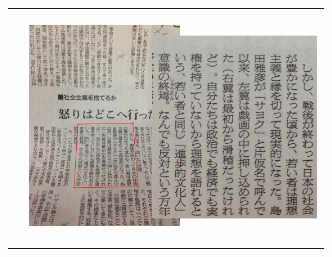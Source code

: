 \documentclass[a4paper,11pt]{article}
\makeatletter
\newlength{\outerbordwidth}
\newcommand{\resheading}[1]{\vspace{-5pt}
    \parbox{\textwidth}{\setlength{\FrameSep}{\outerbordwidth}
    \begin{shaded}
        \setlength{\fboxsep}{0pt}
        \framebox[\textwidth][l]{\setlength{\fboxsep}{4pt}\fcolorbox{shadecolorB}{shadecolorB}{\textbf{\sffamily{\mbox{~}\makebox[6.762in][l]{\large #1} \vphantom{p\^{E}}}}}}
    \end{shaded}
  }\vspace{-7pt}
}
\newcommand{\ressubheadingsingleline}[2]{
    \begin{tabular*}{6.5in}{l@{\extracolsep{\fill}}r}
        \textbf{#1} & #2 \\
    \end{tabular*}\vspace{-6pt}
}
\newcommand{\CC}{C\nolinebreak\hspace{-.05em}\raisebox{.4ex}{\tiny\bf +}\nolinebreak\hspace{-.10em}\raisebox{.4ex}{\tiny\bf +}}
\newcommand{\CS}{C\nolinebreak\hspace{-.05em}\raisebox{.6ex}{\scriptsize\bf{\#}}}
\makeatother
\begin{document}
\begin{itemize}
\begin{tabular*}{6.5in}{p{3.3in}p{3.2in}}
\begin{itemize}
			\end{itemize}
			\vspace{-23pt}
		& 
			\vspace{-10pt}
			\begin{flushright}
			\includegraphics[width=3in]{document}
			\end{flushright}
			\vspace{-50pt}
	    \end{tabular*} 
\end{itemize}	
\end{document}
